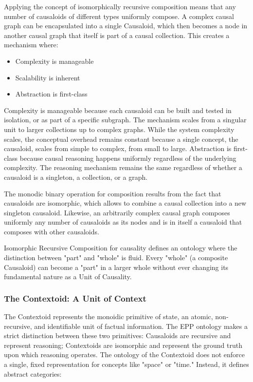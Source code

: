 Applying the concept of isomorphically recursive composition means that any number of causaloids of different types uniformly compose. A complex causal graph can be encapsulated into a single Causaloid, which then becomes a node in another causal graph that itself is part of a causal collection. This creates a mechanism where:

\begin{itemize}
	\item Complexity is manageable
	\item Scalability is inherent
	\item Abstraction is first-class
\end{itemize}

Complexity is manageable because each causaloid can be built and tested in isolation, or as part of a specific subgraph. The mechanism scales from a singular unit to larger collections up to complex graphs. While the system complexity scales, the conceptual overhead remains constant because a single concept, the causaloid, scales from simple to complex, from small to large. Abstraction is first-class because causal reasoning happens uniformly regardless of the underlying complexity. The reasoning mechanism remains the same regardless of whether a causaloid is a singleton, a collection, or a graph.

The monodic binary operation for composition results from the fact that causaloids are isomorphic, which allows to combine a causal collection into a new singleton causaloid. Likewise, an arbitrarily complex causal graph composes uniformly any number of causaloids as its nodes and is in itself a causaloid that composes with other causaloids. 

Isomorphic Recursive Composition for causality defines an ontology where the distinction between "part" and "whole" is fluid. Every "whole" (a composite Causaloid) can become a "part" in a larger whole without ever changing its fundamental nature as a Unit of  Causality.

\subsubsection{The Contextoid: A Unit of Context}
\label{sec:ontology_contextoid}

The Contextoid represents the monoidic primitive of state, an atomic, non-recursive, and identifiable unit of factual information. The EPP ontology makes a strict distinction between these two primitives: Causaloids are recursive and represent reasoning; Contextoids are isomorphic and represent the ground truth upon which reasoning operates. The ontology of the Contextoid does not enforce a single, fixed representation for concepts like "space" or "time." Instead, it defines abstract categories:

